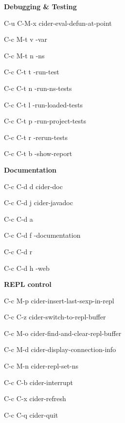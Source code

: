 \documentclass[a4paper,10pt]{article}
\renewcommand\section[1]{\bigskip\par\textbf{\large#1}\medskip}
\newcommand\keyify[1]{\keys{\ttfamily#1}}
\begin{document}
\begin{multicols}{2}
\columnbreak

\section{Debugging \& Testing}
\begin{keylist}[labelwidth=\widthof{\keyify{C-c C-d C-a}}]
\item[C-u C-M-x] cider-eval-defun-at-point
\item[C-c M-t v] -var
\item[C-c M-t n] \ns                    -ns
\item[C-c C-t t] -run-test
\item[C-c C-t n] \ns            -run-ns-tests
\item[C-c C-t l] \ns            -run-loaded-tests
\item[C-c C-t p] \ns            -run-project-tests
\item[C-c C-t r] \ns            -rerun-tests
\item[C-c C-t b] \ns            -show-report
\end{keylist}

\section{Documentation}
\begin{keylist}[labelwidth=\widthof{\keyify{C-c C-d C-a}}]
  \item[C-c C-d d] cider-doc
  \item[C-c C-d j] cider-javadoc
  \item[C-c C-d a] 
  \item[C-c C-d f] \ns               -documentation
  \item[C-c C-d r] 
  \item[C-c C-d h] \ns                -web
\end{keylist}

\section{REPL control}
\begin{keylist}[labelwidth=\widthof{\keyify{C-c M-c}}]
  \item[C-c M-p] cider-insert-last-sexp-in-repl
  \item[C-c C-z] cider-switch-to-repl-buffer
  \item[C-c M-o] cider-find-and-clear-repl-buffer
  \item[C-c M-d] cider-display-connection-info
  \item[C-c M-n] cider-repl-set-ns
  \item[C-c C-b] cider-interrupt
  \item[C-c C-x] cider-refresh
  \item[C-c C-q] cider-quit
\end{keylist}
\end{multicols}
\end{document}
